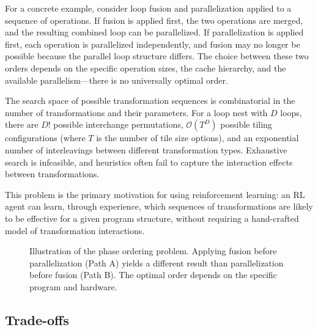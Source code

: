 For a concrete example, consider loop fusion and parallelization applied to a sequence of operations. If fusion is applied first, the two operations are merged, and the resulting combined loop can be parallelized. If parallelization is applied first, each operation is parallelized independently, and fusion may no longer be possible because the parallel loop structure differs. The choice between these two orders depends on the specific operation sizes, the cache hierarchy, and the available parallelism—there is no universally optimal order.

The search space of possible transformation sequences is combinatorial in the number of transformations and their parameters. For a loop nest with $D$ loops, there are $D!$ possible interchange permutations, $\mathcal{O}(T^D)$ possible tiling configurations (where $T$ is the number of tile size options), and an exponential number of interleavings between different transformation types. Exhaustive search is infeasible, and heuristics often fail to capture the interaction effects between transformations.

This problem is the primary motivation for using reinforcement learning: an RL agent can learn, through experience, which sequences of transformations are likely to be effective for a given program structure, without requiring a hand-crafted model of transformation interactions.

\begin{figure}[H]
    \centering
    \caption{Illustration of the phase ordering problem. Applying fusion before parallelization (Path A) yields a different result than parallelization before fusion (Path B). The optimal order depends on the specific program and hardware.}
    \label{fig:phase-ordering}
\end{figure}

\subsection{Trade-offs}

